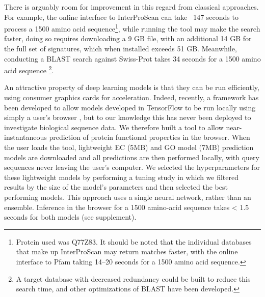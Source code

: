 There is arguably room for improvement in this regard from classical approaches. For example, the online interface to InterProScan can take ~147 seconds to process a 1500 amino acid sequence\footnote{Protein used was Q77Z83. It should be noted that the individual databases that make up InterProScan may return matches faster, with the online interface to Pfam taking 14--20 seconds for a 1500 amino acid sequence.}, while running the tool may make the search faster, doing so requires downloading a 9 GB file, with an additional 14 GB for the full set of signatures, which when installed exceeds 51 GB. Meanwhile, conducting a BLAST search against Swiss-Prot takes 34 seconds for a 1500 amino acid sequence \footnote{A target database with decreased redundancy could be built to reduce this search time, and other optimizations of BLAST have been developed.}.

An attractive property of deep learning models is that they can be run efficiently, using consumer graphics cards for acceleration. Indeed, recently, a framework has been developed to allow models developed in TensorFlow to be run locally using simply a user's browser \citep{tfjs}, but to our knowledge this has never been deployed to investigate biological sequence data. We therefore built a tool to allow near-instantaneous prediction of protein functional properties in the browser. When the user loads the tool, lightweight EC (5MB) and GO model (7MB) prediction models are downloaded and all predictions are then performed locally, with query sequences never leaving the user's computer.  We selected the hyperparameters for these lightweight models by performing a tuning study in which we filtered results by the size of the model's parameters and then selected the best performing models. This approach uses a single neural network, rather than an ensemble. Inference in the browser for a 1500 amino-acid sequence takes < 1.5 seconds for both models (see supplement).


